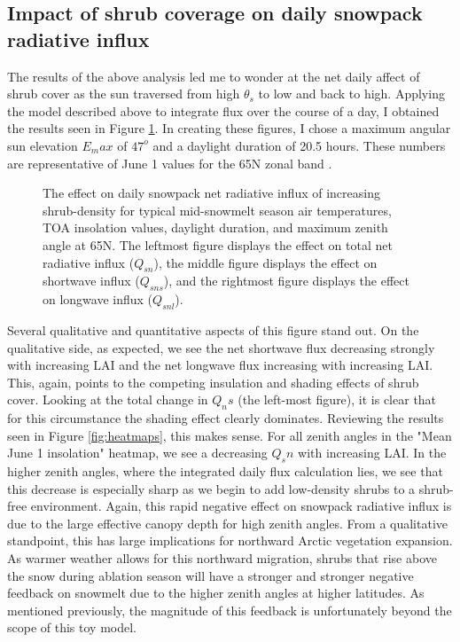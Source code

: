 \documentclass[
10pt, %
letterpaper, %
oneside, %
headinclude,footinclude, %
BCOR5mm, %
]{scrartcl}
\begin{document}
\subsection{Impact of shrub coverage on daily snowpack radiative influx}
The results of the above analysis led me to wonder at the net daily affect of shrub cover as the sun traversed from high $\theta_s$ to low and back to high. Applying the model described above to integrate flux over the course of a day, I obtained the results seen in Figure \ref{fig:daily_int}. In creating these figures, I chose a maximum angular sun elevation $E_max$ of $47^o$ and a daylight duration of 20.5 hours. These numbers are representative of June 1 values for the 65N zonal band \cite{us_department_of_commerce_esrl_????-1}.

\begin{figure}
\centering 
\caption{The effect on daily snowpack net radiative influx of increasing shrub-density for typical mid-snowmelt season air temperatures, TOA insolation values, daylight duration, and maximum zenith angle at 65N. The leftmost figure displays the effect on total net radiative influx ($Q_{sn}$), the middle figure displays the effect on shortwave influx ($Q_{sns}$), and the rightmost figure displays the effect on longwave influx ($Q_{snl}$).}
\label{fig:daily_int} 
\end{figure}

Several qualitative and quantitative aspects of this figure stand out. On the qualitative side, as expected, we see the net shortwave flux decreasing strongly with increasing LAI and the net longwave flux increasing with increasing LAI. This, again, points to the competing insulation and shading effects of shrub cover. Looking at the total change in $Q_ns$ (the left-most figure), it is clear that for this circumstance the shading effect clearly dominates. Reviewing the results seen in Figure \ref{fig:heatmaps}, this makes sense. For all zenith angles in the "Mean June 1 insolation" heatmap, we see a decreasing $Q_sn$ with increasing LAI. In the higher zenith angles, where the integrated daily flux calculation lies, we see that this decrease is especially sharp as we begin to add low-density shrubs to a shrub-free environment. Again, this rapid negative effect on snowpack radiative influx is due to the large effective canopy depth for high zenith angles. From a qualitative standpoint, this has large implications for northward Arctic vegetation expansion. As warmer weather allows for this northward migration, shrubs that rise above the snow during ablation season will have a stronger and stronger negative feedback on snowmelt due to the higher zenith angles at higher latitudes. As mentioned previously, the magnitude of this feedback is unfortunately beyond the scope of this toy model.
\end{document}
